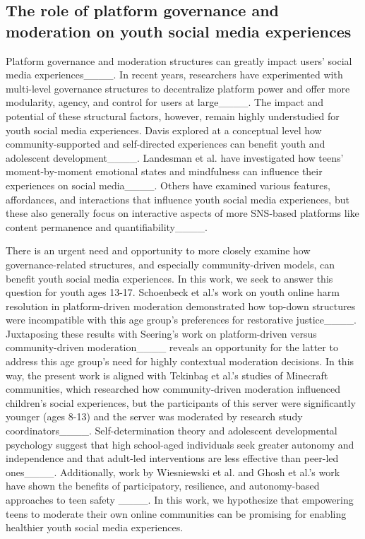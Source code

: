 \subsection{The role of platform governance and moderation on youth social media experiences}
Platform governance and moderation structures can greatly impact users' social media experiences____. In recent years, researchers have experimented with multi-level governance structures to decentralize platform power and offer more modularity, agency, and control for users at large____. The impact and potential of these structural factors, however, remain highly understudied for youth social media experiences. Davis explored at a conceptual level how community-supported and self-directed experiences can benefit youth and adolescent development____. Landesman et al. have investigated how teens' moment-by-moment emotional states and mindfulness can influence their experiences on social media____. 
Others have examined various features, affordances, and interactions that influence youth social media experiences, but these also generally focus on interactive aspects of more SNS-based platforms like content permanence and quantifiability____. 

There is an urgent need and opportunity to more closely examine how governance-related structures, and especially community-driven models, can benefit youth social media experiences. In this work, we seek to answer this question for youth ages 13-17. Schoenbeck et al.'s work on youth online harm resolution in platform-driven moderation demonstrated how top-down structures were incompatible with this age group's preferences for restorative justice____. Juxtaposing these results with Seering's work on platform-driven versus community-driven moderation____ reveals an opportunity for the latter to address this age group's need for highly contextual moderation decisions. In this way, the present work is aligned with Tekinbaş et al.'s studies of Minecraft communities, which researched how community-driven moderation influenced children's social experiences, but the participants of this server were significantly younger (ages 8-13) and the server was moderated by research study coordinators____. Self-determination theory and adolescent developmental psychology suggest that high school-aged individuals seek greater autonomy and independence and that adult-led interventions are less effective than peer-led ones____. Additionally, work by Wiesniewski et al. and Ghosh et al.'s work have shown the benefits of participatory, resilience, and autonomy-based approaches to teen safety ____. In this work, we hypothesize that empowering teens to moderate their own online communities can be promising for enabling healthier youth social media experiences.